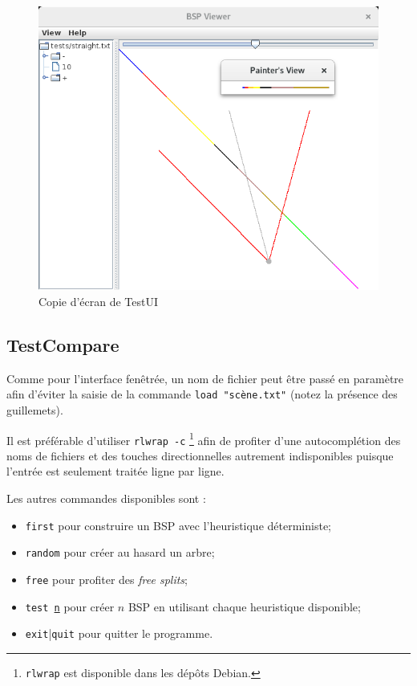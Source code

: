 \documentclass[12pt,twocolumn]{article}
\begin{document}
\begin{figure}[h]
\center
\includegraphics[width=\columnwidth]{ui.png} %
\caption{Copie d'écran de TestUI}\label{fig:screen}
\end{figure}


\subsection{TestCompare}
Comme pour l'interface fenêtrée,
un nom de fichier peut être passé en paramètre afin d'éviter la saisie
de la commande \texttt{load "scène.txt"} (notez la présence des guillemets).

Il est préférable d'utiliser \texttt{rlwrap -c}
\footnote{\texttt{rlwrap} est disponible dans les dépôts Debian.}
afin de profiter d'une autocomplétion des noms de fichiers et
des touches directionnelles autrement indisponibles puisque
l'entrée est seulement traitée ligne par ligne.

Les autres commandes disponibles sont :
\begin{itemize}
	\item \texttt{first} pour construire un BSP avec l'heuristique déterministe;
	\item \texttt{random} pour créer au hasard un arbre;
	\item \texttt{free} pour profiter des \textit{free splits};
	\item \texttt{test \underline{n}} pour créer $n$ BSP en utilisant chaque
		heuristique disponible;
	\item \texttt{exit}|\texttt{quit} pour quitter le programme.
\end{itemize}
\end{document}
